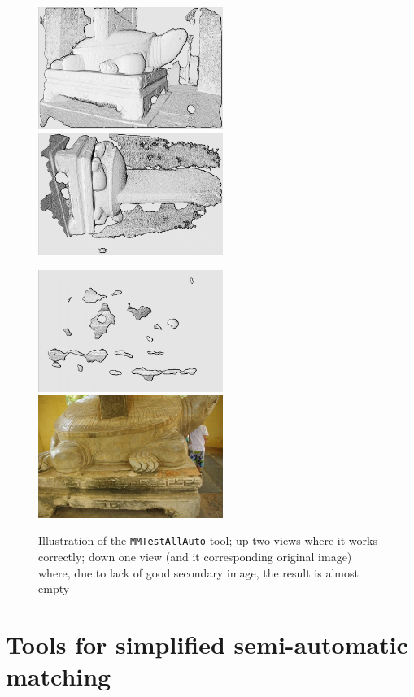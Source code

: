 \begin{figure}
\begin{center}
\includegraphics[width=60mm]{FIGS/Tortue/Dep1.jpg}
\includegraphics[width=60mm]{FIGS/Tortue/Dep2.jpg}

\includegraphics[width=60mm]{FIGS/Tortue/Dep3.jpg}
\includegraphics[width=60mm]{FIGS/Tortue/RIMGP6900.JPG}
\end{center}
\caption{Illustration of the {\tt MMTestAllAuto} tool; up two views where it works correctly;
down one view (and it corresponding original image) where, due to lack of good secondary image, 
the result is almost empty}
\label{FIG:Tortue:AllAuto}
\end{figure}


\section{Tools for simplified semi-automatic matching}

